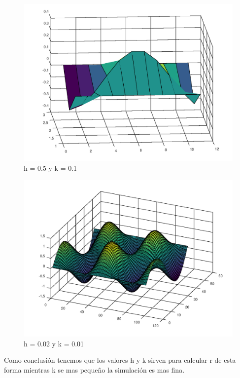 \documentclass{article}
\begin{document}
\begin{figure}[H]
    \centering
    \includegraphics[scale=0.5]{1_2.png}
    \caption{h = 0.5 y k = 0.1}
    \label{fig:Solucion Real}
\end{figure}
\begin{figure}[H]
    \centering
    \includegraphics[scale=0.5]{1_3.png}
    \caption{h = 0.02 y k = 0.01}
    \label{fig:Solucion Real}
\end{figure}
Como conclusión tenemos que los valores h y k sirven para calcular r de esta forma mientras k se mas pequeño la simulación es mas fina.
\end{document}
